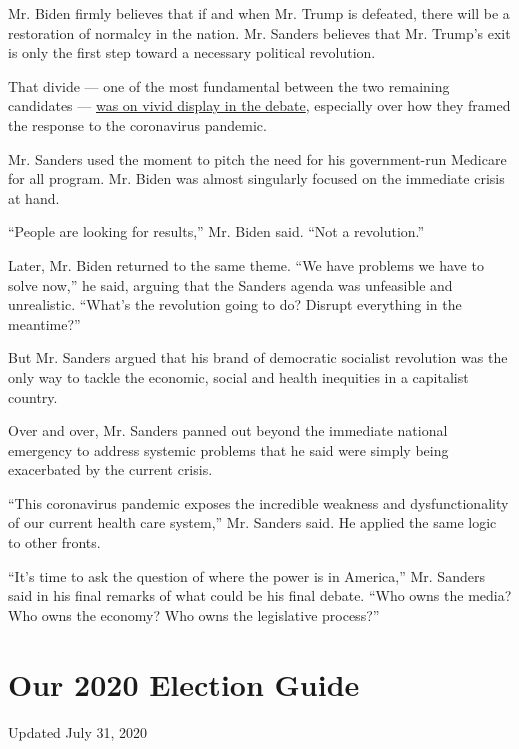 Mr. Biden firmly believes that if and when Mr. Trump is defeated, there
will be a restoration of normalcy in the nation. Mr. Sanders believes
that Mr. Trump's exit is only the first step toward a necessary
political revolution.

That divide --- one of the most fundamental between the two remaining
candidates ---
\href{https://www.nytimes.com/2020/03/16/us/politics/debate-biden-sanders.html}{was
on vivid display in the debate}, especially over how they framed the
response to the coronavirus pandemic.

Mr. Sanders used the moment to pitch the need for his government-run
Medicare for all program. Mr. Biden was almost singularly focused on the
immediate crisis at hand.

``People are looking for results,'' Mr. Biden said. ``Not a
revolution.''

Later, Mr. Biden returned to the same theme. ``We have problems we have
to solve now,'' he said, arguing that the Sanders agenda was unfeasible
and unrealistic. ``What's the revolution going to do? Disrupt everything
in the meantime?''

But Mr. Sanders argued that his brand of democratic socialist revolution
was the only way to tackle the economic, social and health inequities in
a capitalist country.

Over and over, Mr. Sanders panned out beyond the immediate national
emergency to address systemic problems that he said were simply being
exacerbated by the current crisis.

``This coronavirus pandemic exposes the incredible weakness and
dysfunctionality of our current health care system,'' Mr. Sanders said.
He applied the same logic to other fronts.

``It's time to ask the question of where the power is in America,'' Mr.
Sanders said in his final remarks of what could be his final debate.
``Who owns the media? Who owns the economy? Who owns the legislative
process?''

\hypertarget{our-2020-election-guide}{%
\section{Our 2020 Election Guide}\label{our-2020-election-guide}}

Updated July 31, 2020

